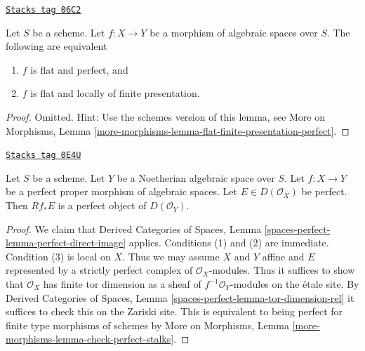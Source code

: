 \begin{lemma}
\label{spaces-more-morphisms-lemma-flat-finite-presentation-perfect}
\href{https://stacks.math.columbia.edu/tag/06C2}{\texttt{Stacks tag 06C2}}

Let $S$ be a scheme. Let $f : X \to Y$ be a morphism of algebraic spaces over
$S$. The following are equivalent
\begin{enumerate}
\item $f$ is flat and perfect, and
\item $f$ is flat and locally of finite presentation.
\end{enumerate}
\end{lemma}

\begin{proof}
Omitted. Hint: Use the schemes version of this lemma, see
More on Morphisms,
Lemma \ref{more-morphisms-lemma-flat-finite-presentation-perfect}.
\end{proof}

\begin{lemma}
\label{spaces-more-morphisms-lemma-perfect-proper-perfect-direct-image}
\href{https://stacks.math.columbia.edu/tag/0E4U}{\texttt{Stacks tag 0E4U}}

Let $S$ be a scheme. Let $Y$ be a Noetherian algebraic space over $S$.
Let $f : X \to Y$ be a perfect proper morphism of algebraic spaces.
Let $E \in D(\mathcal{O}_X)$ be perfect. Then
$Rf_*E$ is a perfect object of $D(\mathcal{O}_Y)$.
\end{lemma}

\begin{proof}
We claim that Derived Categories of Spaces, Lemma
\ref{spaces-perfect-lemma-perfect-direct-image} applies.
Conditions (1) and (2) are immediate. Condition (3) is local
on $X$. Thus we may assume $X$ and $Y$ affine and $E$
represented by a strictly perfect complex of $\mathcal{O}_X$-modules.
Thus it suffices to show that $\mathcal{O}_X$ has finite
tor dimension as a sheaf of $f^{-1}\mathcal{O}_Y$-modules
on the \'etale site. By Derived Categories of Spaces, Lemma
\ref{spaces-perfect-lemma-tor-dimension-rel} it suffices to
check this on the Zariski site. This is equivalent to being perfect
for finite type morphisms of schemes by More on Morphisms,
Lemma \ref{more-morphisms-lemma-check-perfect-stalks}.
\end{proof}

